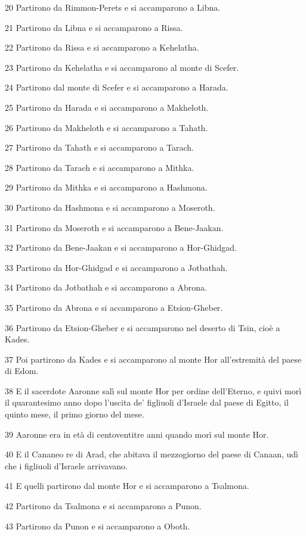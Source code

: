 \par 20 Partirono da Rimmon-Perets e si accamparono a Libna.
\par 21 Partirono da Libna e si accamparono a Rissa.
\par 22 Partirono da Rissa e si accamparono a Kehelatha.
\par 23 Partirono da Kehelatha e si accamparono al monte di Scefer.
\par 24 Partirono dal monte di Scefer e si accamparono a Harada.
\par 25 Partirono da Harada e si accamparono a Makheloth.
\par 26 Partirono da Makheloth e si accamparono a Tahath.
\par 27 Partirono da Tahath e si accamparono a Tarach.
\par 28 Partirono da Tarach e si accamparono a Mithka.
\par 29 Partirono da Mithka e si accamparono a Hashmona.
\par 30 Partirono da Hashmona e si accamparono a Moseroth.
\par 31 Partirono da Moseroth e si accamparono a Bene-Jaakan.
\par 32 Partirono da Bene-Jaakan e si accamparono a Hor-Ghidgad.
\par 33 Partirono da Hor-Ghidgad e si accamparono a Jotbathah.
\par 34 Partirono da Jotbathah e si accamparono a Abrona.
\par 35 Partirono da Abrona e si accamparono a Etsion-Gheber.
\par 36 Partirono da Etsion-Gheber e si accamparono nel deserto di Tsin, cioè a Kades.
\par 37 Poi partirono da Kades e si accamparono al monte Hor all'estremità del paese di Edom.
\par 38 E il sacerdote Aaronne salì sul monte Hor per ordine dell'Eterno, e quivi morì il quarantesimo anno dopo l'uscita de' figliuoli d'Israele dal paese di Egitto, il quinto mese, il primo giorno del mese.
\par 39 Aaronne era in età di centoventitre anni quando morì sul monte Hor.
\par 40 E il Cananeo re di Arad, che abitava il mezzogiorno del paese di Canaan, udì che i figliuoli d'Israele arrivavano.
\par 41 E quelli partirono dal monte Hor e si accamparono a Tsalmona.
\par 42 Partirono da Tsalmona e si accamparono a Punon.
\par 43 Partirono da Punon e si accamparono a Oboth.
